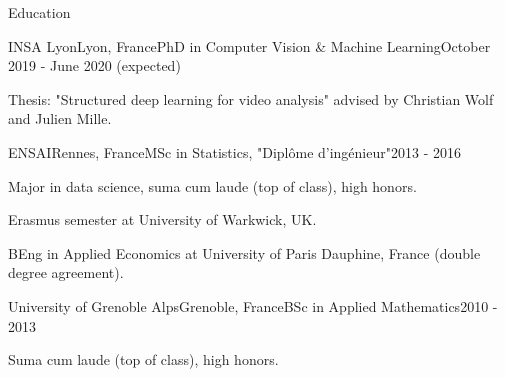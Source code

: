 \documentclass{resume} %
\begin{document}

\begin{rSection}{Education}
     \begin{rSubsection}{INSA Lyon}{Lyon, France}{PhD in Computer Vision \& Machine Learning}{October 2019 - June 2020 (expected)}
            \item Thesis: "Structured deep learning for video analysis" advised by Christian Wolf and Julien Mille.
    \end{rSubsection}
    \begin{rSubsection}{ENSAI}{Rennes, France}{MSc in Statistics, "Diplôme d'ingénieur"}{2013 - 2016}
            \item Major in data science, suma cum laude (top of class), high honors.
            \item Erasmus semester at University of Warkwick, UK.
            \item BEng in Applied Economics at University of Paris Dauphine, France (double degree agreement).
    \end{rSubsection}
    \begin{rSubsection}{University of Grenoble Alps}{Grenoble, France}{BSc in Applied Mathematics}{2010 - 2013}
            \item Suma cum laude (top of class), high honors.
    \end{rSubsection}
\end{rSection}
\end{document}
